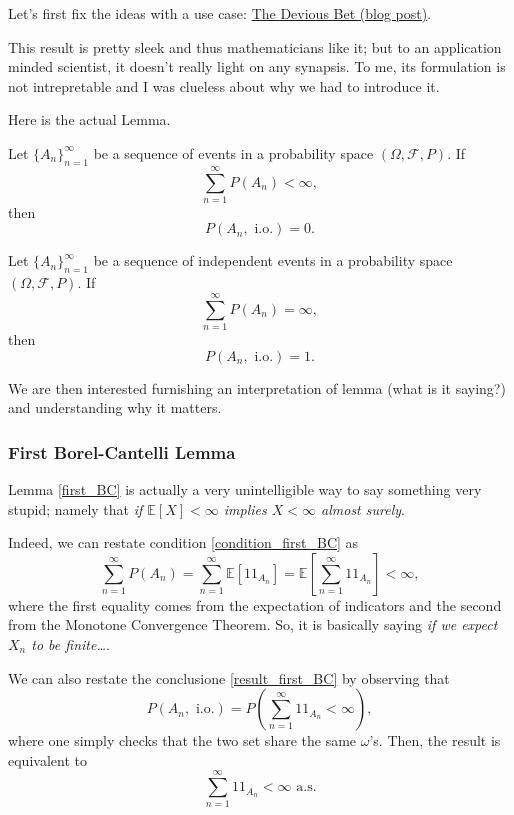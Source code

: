 Let's first fix the ideas with a use case: \href{https://almostsurelymath.blog/2019/09/02/a-devious-bet-the-borel-cantelli-lemma/}{The Devious Bet (blog post)}.

This result is pretty sleek and thus mathematicians like it; but to an application minded scientist, it doesn't really light on any synapsis. To me, its formulation is not intrepretable and I was clueless about why we had to introduce it. 

Here is the actual Lemma.

\begin{my_theorem}
	\label{first_BC}
	Let $\{A_n\}_{n=1}^{\infty}$ be a sequence of events in a probability space $(\Omega, \mathcal{F}, P)$. If
	\[ \label{condition_first_BC} \sum_{n=1}^{\infty} P(A_n) < \infty,\]
	then
	\[ \label{result_first_BC} P(A_n,\text{ i.o.}) = 0.\]
\end{my_theorem}
	
\begin{my_theorem}
	\label{second_BC}
	Let $\{A_n\}_{n=1}^{\infty}$ be a sequence of independent events in a probability space $(\Omega, \mathcal{F}, P)$. If
	\[\sum_{n=1}^{\infty} P(A_n) = \infty,\]
	then
	\[P(A_n,\text{ i.o.}) = 1.\]
\end{my_theorem}

We are then interested furnishing an interpretation of lemma (what is it saying?) and understanding why it matters.

\subsubsection{First Borel-Cantelli Lemma}
Lemma \ref{first_BC} is actually a very unintelligible way to say something very stupid; namely that \textit{if $\mathbb{E}[X] < \infty$ implies $X < \infty$ almost surely}.

Indeed, we can restate condition \ref{condition_first_BC} as
\[\sum_{n=1}^{\infty} P(A_n) = \sum_{n=1}^{\infty} \mathbb{E}[1\!\!1_{A_n}]=\mathbb{E}\left[\sum_{n=1}^{\infty} 1\!\!1_{A_n}\right] < \infty, \]
where the first equality comes from the expectation of indicators and the second from the Monotone Convergence Theorem. So, it is basically saying \textit{if we expect $X_n$ to be finite\dots}.

We can also restate the conclusione \ref{result_first_BC} by observing that
\[P(A_n,\text{ i.o.}) = P(\sum_{n=1}^{\infty} 1\!\!1_{A_n} < \infty),\]
where one simply checks that the two set share the same $\omega$'s. Then, the result is equivalent to
\[\sum_{n=1}^{\infty} 1\!\!1_{A_n} < \infty \text{ a.s.}\]

